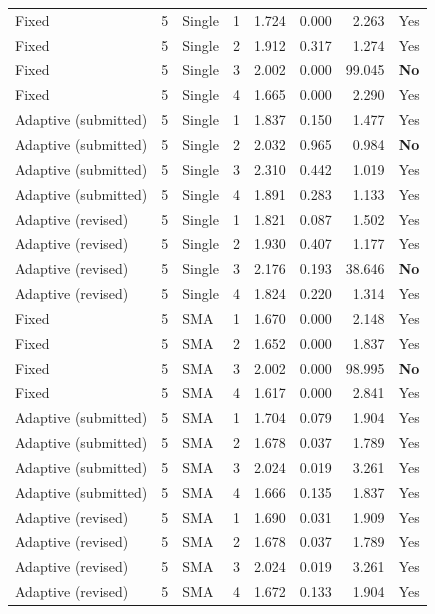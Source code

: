 {\begin{longtable}{lllrrrrl}
Fixed & 5 & Single & 1 & 1.724 & 0.000 & 2.263 & Yes\\
Fixed & 5 & Single & 2 & 1.912 & 0.317 & 1.274 & Yes\\
Fixed & 5 & Single & 3 & 2.002 & 0.000 & 99.045 & \textbf{No}\\
Fixed & 5 & Single & 4 & 1.665 & 0.000 & 2.290 & Yes\\
Adaptive (submitted) & 5 & Single & 1 & 1.837 & 0.150 & 1.477 & Yes\\
Adaptive (submitted) & 5 & Single & 2 & 2.032 & 0.965 & 0.984 & \textbf{No}\\
Adaptive (submitted) & 5 & Single & 3 & 2.310 & 0.442 & 1.019 & Yes\\
Adaptive (submitted) & 5 & Single & 4 & 1.891 & 0.283 & 1.133 & Yes\\
Adaptive (revised) & 5 & Single & 1 & 1.821 & 0.087 & 1.502 & Yes\\
Adaptive (revised) & 5 & Single & 2 & 1.930 & 0.407 & 1.177 & Yes\\
Adaptive (revised) & 5 & Single & 3 & 2.176 & 0.193 & 38.646 & \textbf{No}\\
Adaptive (revised) & 5 & Single & 4 & 1.824 & 0.220 & 1.314 & Yes\\
Fixed & 5 & SMA & 1 & 1.670 & 0.000 & 2.148 & Yes\\
Fixed & 5 & SMA & 2 & 1.652 & 0.000 & 1.837 & Yes\\
Fixed & 5 & SMA & 3 & 2.002 & 0.000 & 98.995 & \textbf{No}\\
Fixed & 5 & SMA & 4 & 1.617 & 0.000 & 2.841 & Yes\\
Adaptive (submitted) & 5 & SMA & 1 & 1.704 & 0.079 & 1.904 & Yes\\
Adaptive (submitted) & 5 & SMA & 2 & 1.678 & 0.037 & 1.789 & Yes\\
Adaptive (submitted) & 5 & SMA & 3 & 2.024 & 0.019 & 3.261 & Yes\\
Adaptive (submitted) & 5 & SMA & 4 & 1.666 & 0.135 & 1.837 & Yes\\
Adaptive (revised) & 5 & SMA & 1 & 1.690 & 0.031 & 1.909 & Yes\\
Adaptive (revised) & 5 & SMA & 2 & 1.678 & 0.037 & 1.789 & Yes\\
Adaptive (revised) & 5 & SMA & 3 & 2.024 & 0.019 & 3.261 & Yes\\
Adaptive (revised) & 5 & SMA & 4 & 1.672 & 0.133 & 1.904 & Yes\\
\end{longtable}}
